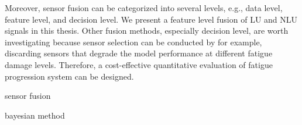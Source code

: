 Moreover, sensor fusion can be categorized into several levels, e.g., data level, feature level, and decision level. We present a feature level fusion of LU and NLU signals in this thesis. Other fusion methods, especially decision level, are worth investigating because sensor selection can be conducted by for example, discarding sensors that degrade the model performance at different fatigue damage levels. Therefore, a cost-effective quantitative evaluation of fatigue progression system can be designed.

sensor fusion

bayesian method